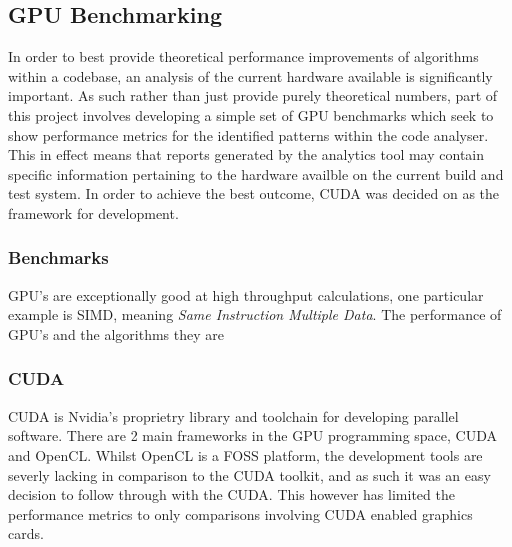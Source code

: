 \subsection{GPU Benchmarking}
In order to best provide theoretical performance improvements of algorithms within a codebase, an analysis of the current hardware available is significantly important. As such rather than just provide purely theoretical numbers, part of this project involves developing a simple set of GPU benchmarks which seek to show performance metrics for the identified patterns within the code analyser. This in effect means that reports generated by the analytics tool may contain specific information pertaining to the hardware availble on the current build and test system. In order to achieve the best outcome, CUDA was decided on as the framework for development.

\subsubsection{Benchmarks}
GPU's are exceptionally good at high throughput calculations, one particular example is SIMD, meaning \emph{Same Instruction Multiple Data}. The performance of GPU's and the algorithms they are 

\subsubsection{CUDA}
CUDA is Nvidia's proprietry library and toolchain for developing parallel software. There are 2 main frameworks in the GPU programming space, CUDA and OpenCL. Whilst OpenCL is a FOSS platform, the development tools are severly lacking in comparison to the CUDA toolkit, and as such it was an easy decision to follow through with the CUDA. This however has limited the performance metrics to only comparisons involving CUDA enabled graphics cards.




